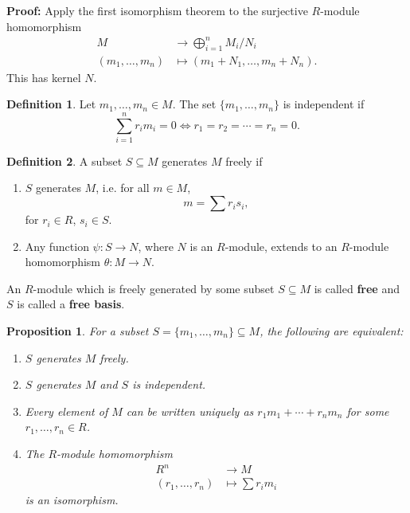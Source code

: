 \documentclass[12pt]{article}
\newtheorem{proposition}{Proposition}[section]
\theoremstyle{definition}
\newtheorem{definition}{Definition}[section]
\theoremstyle{remark}
\begin{document}
\begin{adjustbox}{minipage = \columnwidth - 25.5pt, margin=1em, frame=1pt, margin=0em}
	\textbf{Proof:} Apply the first isomorphism theorem to the surjective $R$-module homomorphism
\begin{align*}
	M &\to \bigoplus_{i = 1}^{n} M_i/N_i \\
	(m_1, \ldots, m_n) &\mapsto (m_1 + N_1, \ldots, m_n + N_n).
\end{align*}
This has kernel $N$.
\end{adjustbox}

\begin{definition}
	Let $m_1, \ldots, m_n \in M$. The set $\{m_1, \ldots, m_n\}$ is independent if
	\[
	\sum_{i = 1}^{n} r_i m_i = 0 \iff r_1 = r_2 = \cdots = r_n = 0
	.\]
\end{definition}

\begin{definition}
	A subset $S \subseteq M$ generates $M$ freely if
	\begin{enumerate}[label = (\roman*)]
		\item $S$ generates $M$, i.e. for all $m \in M$,
			\[
			m = \sum r_i s_i
			,\]
			for $r_i \in R$, $s_i \in S$.
		\item Any function $\psi : S \to N$, where $N$ is an $R$-module, extends to an $R$-module homomorphism $\theta : M \to N$.
	\end{enumerate}
\end{definition}
An $R$-module which is freely generated by some subset $S \subseteq M$ is called \textbf{free} and $S$ is called a \textbf{free basis}.

\begin{proposition}
	For a subset $S = \{m_1, \ldots, m_n\} \subseteq M$, the following are equivalent:
	\begin{enumerate}[label = \normalfont(\roman*)]
		\item $S$ generates $M$ freely.
		\item $S$ generates $M$ and $S$ is independent.
		\item Every element of $M$ can be written uniquely as $r_1m_1 + \cdots + r_nm_n$ for some $r_1, \ldots, r_n \in R$.
		\item The $R$-module homomorphism
			\begin{align*}
				R^{n} &\to M \\
				(r_1, \ldots, r_n) &\mapsto \sum r_i m_i
			\end{align*}
			is an isomorphism.
	\end{enumerate}
\end{proposition}
\end{document}
